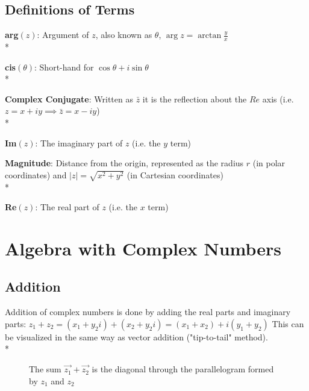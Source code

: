\documentclass[]{article}
\begin{document}
    \subsection{Definitions of Terms}
        \noindent \textbf{arg$(z)$}: Argument of $z$, also known as $\theta$, $\arg{z}=\arctan{\frac{y}{x}}$ \\*
    
        \noindent \textbf{cis$(\theta)$}: Short-hand for $\cos{\theta}+i\sin{\theta}$ \\*
        
        \noindent \textbf{Complex Conjugate}: Written as $\bar{z}$ it is the reflection about the $Re$ axis (i.e. $z=x+iy \implies \bar{z}=x-iy$) \\*
        
        \noindent \textbf{Im$(z)$}: The imaginary part of $z$ (i.e. the $y$ term)
        
        \noindent \textbf{Magnitude}: Distance from the origin, represented as the radius $r$ (in polar coordinates) and $\left|z\right|=\sqrt{x^2+y^2}$ (in Cartesian coordinates) \\*
        
        \noindent \textbf{Re$(z)$}: The real part of $z$ (i.e. the $x$ term)
        
        
\section{Algebra with Complex Numbers}
    \subsection{Addition}
    	\noindent Addition of complex numbers is done by adding the real parts and imaginary parts: $z_1 + z_2 = (x_1+y_2i)+(x_2+y_2i) = (x_1+x_2)+i(y_1+y_2)$ This can be visualized in the same way as vector addition ("tip-to-tail" method). \\*  
        \begin{figure}[!h]
        	\centering
        	\caption{The sum $\vec{z_1}+\vec{z_2}$ is the diagonal through the parallelogram formed by $z_1$ and $z_2$}
        \end{figure}
\end{document}
